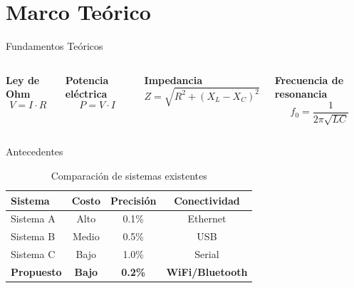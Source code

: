 \documentclass[11pt, spanish, aspectratio=169]{beamer}
\begin{document}
\section{Marco Teórico}

\begin{frame}{Fundamentos Teóricos}
    \begin{columns}
        \textbf{Ley de Ohm}
        \begin{equation}
            V = I \cdot R
        \end{equation}
        
        \textbf{Potencia eléctrica}
        \begin{equation}
            P = V \cdot I
        \end{equation}
        
        \textbf{Impedancia}
        \begin{equation}
            Z = \sqrt{R^2 + (X_L - X_C)^2}
        \end{equation}
        
        \textbf{Frecuencia de resonancia}
        \begin{equation}
            f_0 = \frac{1}{2\pi\sqrt{LC}}
        \end{equation}
    \end{columns}
\end{frame}

\begin{frame}{Antecedentes}
    \begin{table}
        \centering
        \caption{Comparación de sistemas existentes}
        \begin{tabular}{@{}lccc@{}}
            \toprule
            \textbf{Sistema} & \textbf{Costo} & \textbf{Precisión} & \textbf{Conectividad} \\
            \midrule
            Sistema A & Alto & 0.1\% & Ethernet \\
            Sistema B & Medio & 0.5\% & USB \\
            Sistema C & Bajo & 1.0\% & Serial \\
            \textbf{Propuesto} & \textbf{Bajo} & \textbf{0.2\%} & \textbf{WiFi/Bluetooth} \\
            \bottomrule
        \end{tabular}
    \end{table}
\end{frame}
\end{document}
